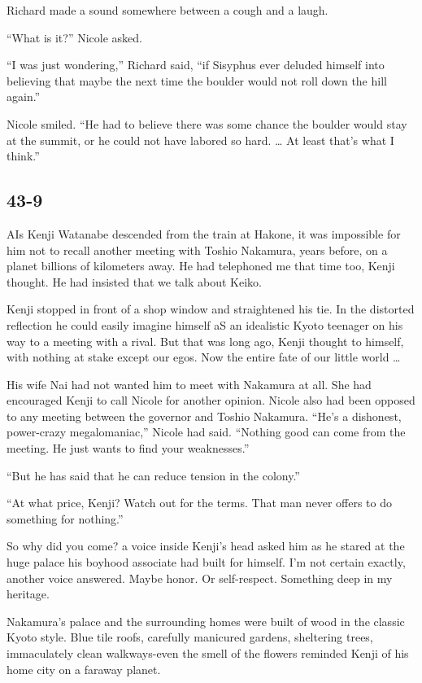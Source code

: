 \documentclass[]{article}
\begin{document}
{Richard made a sound somewhere between a cough and a laugh.

“What is it?” Nicole asked.

“I was just wondering,” Richard said, “if Sisyphus ever deluded himself into believing that maybe the next time the boulder would not roll down the hill again.”

Nicole smiled.  “He had to believe there was some chance the boulder would stay at the summit, or he could not have labored so hard.  … At least that’s what I think.”



\subsection*{43-9}

AIs Kenji Watanabe descended from the train at Hakone, it was impossible for him not to recall another meeting with Toshio Nakamura, years before, on a planet billions of kilometers away.  He had telephoned me that time too, Kenji thought.  He had insisted that we talk about Keiko.

Kenji stopped in front of a shop window and straightened his tie.  In the distorted reflection he could easily imagine himself aS an idealistic Kyoto teenager on his way to a meeting with a rival.  But that was long ago, Kenji thought to himself, with nothing at stake except our egos.  Now the entire fate of our little world …

His wife Nai had not wanted him to meet with Nakamura at all.  She had encouraged Kenji to call Nicole for another opinion.  Nicole also had been opposed to any meeting between the governor and Toshio Nakamura.  “He’s a dishonest, power-crazy megalomaniac,” Nicole had said.  “Nothing good can come from the meeting.  He just wants to find your weaknesses.”

“But he has said that he can reduce tension in the colony.”

“At what price, Kenji? Watch out for the terms.  That man never offers to do something for nothing.”

So why did you come? a voice inside Kenji’s head asked him as he stared at the huge palace his boyhood associate had built for himself.  I’m not certain exactly, another voice answered.  Maybe honor.  Or self-respect.  Something deep in my heritage.

Nakamura’s palace and the surrounding homes were built of wood in the classic Kyoto style.  Blue tile roofs, carefully manicured gardens, sheltering trees, immaculately clean walkways-even the smell of the flowers reminded Kenji of his home city on a faraway planet.

}
\end{document}
